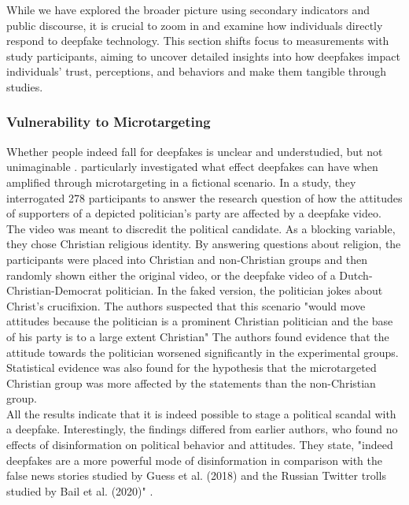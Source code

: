 \documentclass[
  a4paper,  %
  twoside,  %
  bibliography=totoc,
  headsepline,
  cleardoublepage=empty,
  parskip=half,
  draft=false
]{scrbook}
\begin{document}
While we have explored the broader picture using secondary indicators and public discourse, it is crucial to zoom in and examine how individuals directly respond to deepfake technology. This section shifts focus to measurements with study participants, aiming to uncover detailed insights into how deepfakes impact individuals' trust, perceptions, and behaviors and make them tangible through studies.

\subsubsection*{Vulnerability to Microtargeting}
Whether people indeed fall for deepfakes is unclear and understudied, but not unimaginable \cite{dobberMicrotargetedDeepfakesHave2021}. \citet{dobberMicrotargetedDeepfakesHave2021} particularly investigated what effect deepfakes can have when amplified through microtargeting in a fictional scenario. In a study, they interrogated 278 participants to answer the research question of how the attitudes of supporters of a depicted politician's party are affected by a deepfake video. \\
The video was meant to discredit the political candidate. As a blocking variable, they chose Christian religious identity. By answering questions about religion, the participants were placed into Christian and non-Christian groups and then randomly shown either the original video, or the deepfake video of a Dutch-Christian-Democrat politician. In the faked version, the politician jokes about Christ's crucifixion. The authors suspected that this scenario "would move attitudes because the politician is a prominent Christian politician and the base of his party is to a large extent Christian" \cite[p. 75]{dobberMicrotargetedDeepfakesHave2021} The authors found evidence that the attitude towards the politician worsened significantly in the experimental groups. Statistical evidence was also found for the hypothesis that the microtargeted Christian group was more affected by the statements than the non-Christian group.\\
All the results indicate that it is indeed possible to stage a political scandal with a deepfake. Interestingly, the findings differed from earlier authors, who found no effects of disinformation on political behavior and attitudes. They state, "indeed deepfakes are a more powerful mode of disinformation in comparison with the false news stories studied by Guess et al. (2018) and the Russian Twitter trolls studied by Bail et al. (2020)" \cite[p. 82]{dobberMicrotargetedDeepfakesHave2021}.
\end{document}
